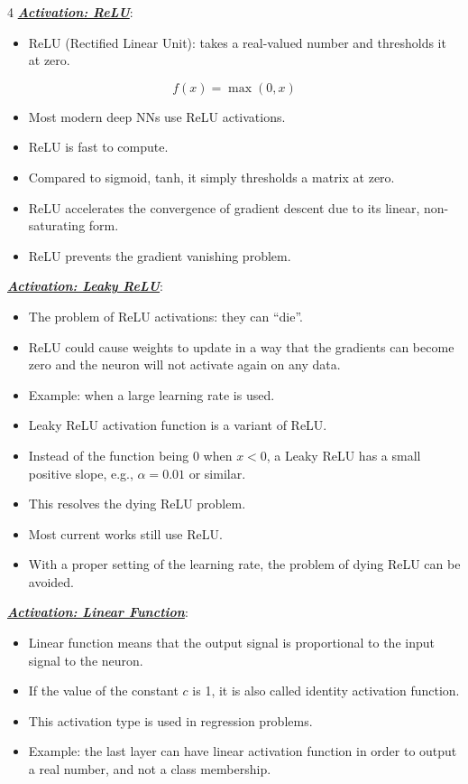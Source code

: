 \documentclass[12pt]{article}
\newcommand{\bulletPoint}[1]{\ul{\textit{\textbf{#1}}}}
\begin{document}
\begin{multicols*}{4}
\bulletPoint{Activation: ReLU}:
\begin{itemize}
\item ReLU (Rectified Linear Unit): takes a real-valued number and thresholds it at zero.
\end{itemize}
\useshortskip
\begin{equation*}
    f(x)=\max(0,x)
\end{equation*}
\begin{itemize}
\item Most modern deep NNs use ReLU activations.
\item ReLU is fast to compute.
\item Compared to sigmoid, tanh, it simply thresholds a matrix at zero.
\item ReLU accelerates the convergence of gradient descent due to its linear, non-saturating form.
\item ReLU prevents the gradient vanishing problem.
\end{itemize}

\bulletPoint{Activation: Leaky ReLU}:
\begin{itemize}
\item The problem of ReLU activations: they can ``die''.
\item ReLU could cause weights to update in a way that the gradients can become zero and the neuron will not activate again on any data.
\item Example: when a large learning rate is used.
\item Leaky ReLU activation function is a variant of ReLU.
\item Instead of the function being 0 when $x<0$, a Leaky ReLU has a small positive slope, e.g., $\alpha=0.01$ or similar.
\item This resolves the dying ReLU problem.
\item Most current works still use ReLU.
\item With a proper setting of the learning rate, the problem of dying ReLU can be avoided.
\end{itemize}

\bulletPoint{Activation: Linear Function}:
\begin{itemize}
\item Linear function means that the output signal is proportional to the input signal to the neuron.
\item If the value of the constant $c$ is 1, it is also called identity activation function.
\item This activation type is used in regression problems.
\item Example: the last layer can have linear activation function in order to output a real number, and not a class membership.
\end{itemize}


\end{multicols*}
\end{document}
